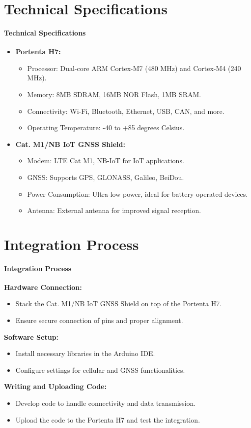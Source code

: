 \section{Technical Specifications}
{
	\framesubtitle{Technical Specifications}
\begin{itemize}
	\item \textbf{Portenta H7:} \cite{ArduinoPortentaH7:2024}
	\begin{itemize}
		\item Processor: Dual-core ARM Cortex-M7 (480 MHz) and Cortex-M4 (240 MHz).
		\item Memory: 8MB SDRAM, 16MB NOR Flash, 1MB SRAM.
		\item Connectivity: Wi-Fi, Bluetooth, Ethernet, USB, CAN, and more.
		\item Operating Temperature: -40 to +85 degrees Celsius.
	\end{itemize}
	\item \textbf{Cat. M1/NB IoT GNSS Shield:} \cite{ArduinoIOTShield:2024}
	\begin{itemize}
		\item Modem: LTE Cat M1, NB-IoT for IoT applications.
		\item GNSS: Supports GPS, GLONASS, Galileo, BeiDou.
		\item Power Consumption: Ultra-low power, ideal for battery-operated devices.
		\item Antenna: External antenna for improved signal reception.
	\end{itemize}
\end{itemize}	
}

\section{Integration Process}
{
	\framesubtitle{Integration Process}
  \textbf{Hardware Connection:}
\begin{itemize}
	\item Stack the Cat. M1/NB IoT GNSS Shield on top of the Portenta H7.
	\item Ensure secure connection of pins and proper alignment.
\end{itemize}
\textbf{Software Setup:}
\begin{itemize}
	\item Install necessary libraries in the Arduino IDE.
	\item Configure settings for cellular and GNSS functionalities.
\end{itemize}
\textbf{Writing and Uploading Code:}
\begin{itemize}
	\item Develop code to handle connectivity and data transmission.
	\item Upload the code to the Portenta H7 and test the integration.
\end{itemize}	
}

